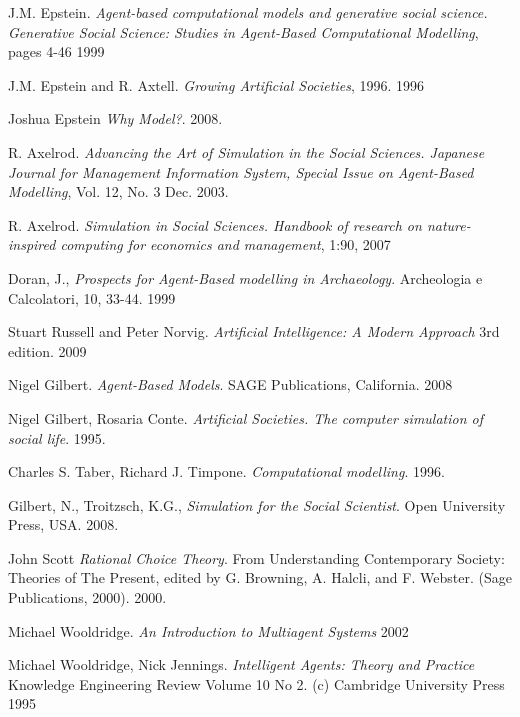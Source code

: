 \documentclass[11pt,oneside,a4paper,openright]{report}
\begin{document}
\begin{thebibliography}{49}

	J.M. Epstein. 
	\emph{Agent-based computational models and generative social science. Generative Social
	Science: Studies in Agent-Based Computational Modelling}, pages 4-46
	1999

	J.M. Epstein and R. Axtell.
	\emph{Growing Artificial Societies}, 1996.
	1996

	Joshua Epstein
	\emph{Why Model?}.
	2008.

	R. Axelrod. 
	\emph{Advancing the Art of Simulation in the Social Sciences. Japanese Journal for Management Information System, Special Issue on Agent-Based Modelling}, Vol. 12, No. 3 
	Dec. 2003. 

	R. Axelrod. 
	\emph{Simulation in Social Sciences. Handbook of research on nature-inspired computing for economics and management}, 1:90, 
	2007

	Doran, J., 
	\emph{Prospects for Agent-Based modelling in Archaeology}. Archeologia e Calcolatori, 10, 33-44.
	1999

	Stuart Russell and Peter Norvig.
	\emph{Artificial Intelligence: A Modern Approach} 3rd edition.
	2009

	Nigel Gilbert.
	\emph{Agent-Based Models}. SAGE Publications, California.
	2008

	Nigel Gilbert, Rosaria Conte.
	\emph{Artificial Societies. The computer simulation of social life}.
	1995.

	Charles S. Taber, Richard J. Timpone.
	\emph{Computational modelling}.
	1996.

	Gilbert, N., Troitzsch, K.G.,
	\emph{Simulation for the Social Scientist}. Open University Press, USA.
	2008.

	John Scott
	\emph{Rational Choice Theory}. From Understanding Contemporary Society: Theories of The Present, edited by G. Browning,
	A. Halcli, and F. Webster. (Sage Publications, 2000).
	2000.

	Michael Wooldridge.
	\emph{An Introduction to Multiagent Systems}
	2002

	 Michael Wooldridge, Nick Jennings.
	\emph{Intelligent Agents: Theory and Practice}  Knowledge Engineering Review Volume 10 No 2. (c) Cambridge
	University Press 
	1995


\end{thebibliography}
\end{document}
